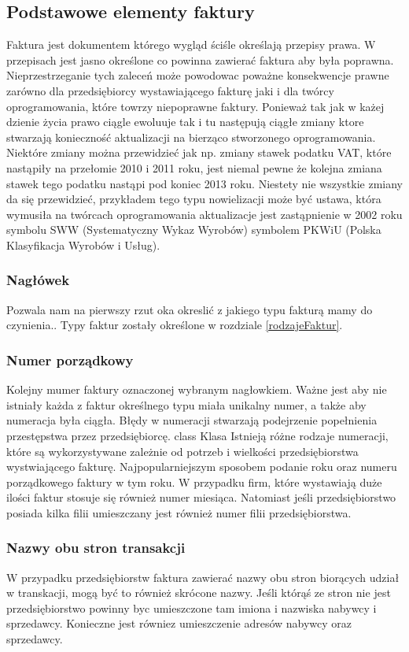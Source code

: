 \documentclass[12pt, a4paper]{article}
\begin{document}
\subsection{Podstawowe elementy faktury}
Faktura jest dokumentem którego wygląd ściśle określają przepisy prawa.
W przepisach jest jasno określone co powinna zawierać faktura aby była poprawna.
Nieprzestrzeganie tych zaleceń może powodowac poważne konsekwencje prawne
zarówno dla przedsiębiorcy wystawiającego fakturę jaki i dla twórcy
oprogramowania, które towrzy niepoprawne faktury. Ponieważ tak jak w każej
dzienie życia prawo ciągle ewoluuje tak i tu następują ciągłe zmiany ktore
stwarzają konieczność aktualizacji na bierząco stworzonego oprogramowania. Niektóre zmiany
można przewidzieć jak np. zmiany stawek podatku VAT, które nastąpiły na
przełomie 2010 i 2011 roku, jest niemal pewne że kolejna zmiana stawek tego
podatku nastąpi pod koniec 2013 roku.
Niestety nie wszystkie zmiany da się przewidzieć, przykładem tego typu
nowielizacji może być ustawa, która wymusiła na twórcach oprogramowania
aktualizacje jest zastąpnienie w 2002 roku symbolu SWW (Systematyczny Wykaz
Wyrobów) symbolem PKWiU (Polska Klasyfikacja Wyrobów i Usług).
\subsubsection{Nagłówek}
Pozwala nam na pierwszy rzut oka okreslić z jakiego typu fakturą mamy do
czynienia.. Typy faktur zostały
określone w rozdziale \ref{rodzajeFaktur}. 
\subsubsection{Numer porządkowy}
Kolejny mumer faktury oznaczonej wybranym nagłowkiem. Ważne jest aby nie
istniały każda z faktur określnego typu miała unikalny numer, a także aby
numeracja była ciągła. Błędy w numeracji stwarzają podejrzenie popełnienia
przestępstwa przez przedsiębiorcę.
class Klasa {
}
Istnieją różne rodzaje numeracji, które są wykorzystywane zależnie od potrzeb i
wielkości przedsiębiorstwa wystwiającego fakturę. Najpopularniejszym sposobem
podanie roku oraz numeru porządkowego faktury w tym roku. W przypadku firm,
które wystawiają duże ilości faktur stosuje się również numer miesiąca.
Natomiast jeśli przedsiębiorstwo posiada kilka filii umieszczany jest również
numer filii przedsiębiorstwa.
\subsubsection{Nazwy obu stron transakcji}
W przypadku przedsiębiorstw faktura zawierać nazwy obu
stron biorących udział w transkacji, mogą być to również skrócone nazwy. Jeśli
którąś ze stron nie jest przedsiębiorstwo powinny byc umieszczone tam imiona i
nazwiska nabywcy i sprzedawcy. Konieczne jest równiez umieszczenie adresów
nabywcy oraz sprzedawcy.
\end{document}
